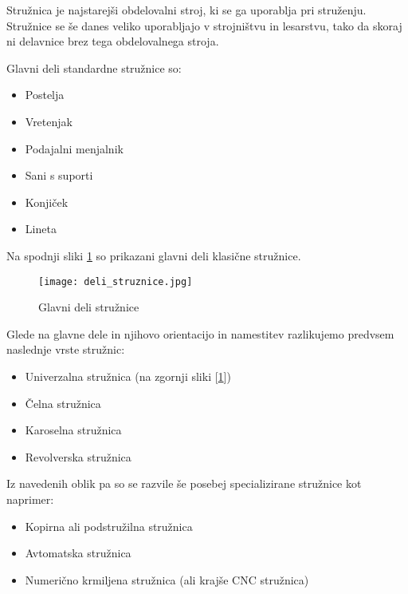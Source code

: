 Stružnica je najstarejši obdelovalni stroj, 
ki se ga uporablja pri struženju. Stružnice se še 
danes veliko uporabljajo v strojništvu in lesarstvu, 
tako da skoraj ni delavnice brez tega obdelovalnega stroja.

\noindent Glavni deli standardne stružnice so:
\begin{itemize}
    \item Postelja
    \item Vretenjak
    \item Podajalni menjalnik
    \item Sani s suporti
    \item Konjiček
    \item Lineta
\end{itemize}

Na spodnji sliki \ref{img:deli_struznice} so prikazani glavni deli klasične stružnice.
\begin{figure}[H]
    \begin{center}
        \texttt{[image: deli\_struznice.jpg]}
        \caption{Glavni deli stružnice
            \cite{deli_struznice}}
        \label{img:deli_struznice}
    \end{center}
\end{figure}

\noindent Glede na glavne dele in njihovo orientacijo in namestitev razlikujemo
predvsem naslednje vrste stružnic:
\begin{itemize}
    \item Univerzalna stružnica (na zgornji sliki [\ref{img:deli_struznice}])
    \item Čelna stružnica
    \item Karoselna stružnica
    \item Revolverska stružnica
\end{itemize}

\noindent Iz navedenih oblik pa so se razvile še posebej specializirane
stružnice kot naprimer:
\begin{itemize}
    \item Kopirna ali podstružilna stružnica
    \item Avtomatska stružnica
    \item Numerično krmiljena stružnica (ali krajše CNC stružnica)
\end{itemize}